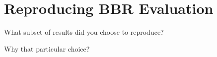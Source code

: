 
\section{Reproducing BBR Evaluation}

 What subset of results did you choose to reproduce?

 Why that particular choice?
